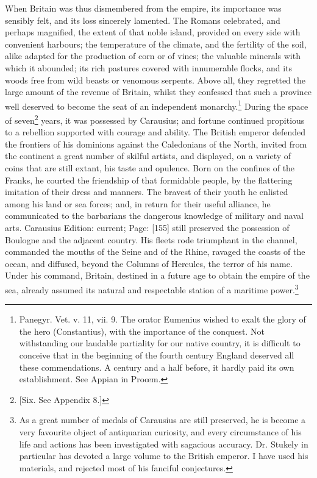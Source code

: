 When Britain was thus dismembered from the empire, its importance was sensibly felt, and its loss sincerely lamented. The Romans celebrated, and perhaps magnified, the extent of that noble island, provided on every side with convenient harbours; the temperature of the climate, and the fertility of the soil, alike adapted for the production of corn or of vines; the valuable minerals with which it abounded; its rich pastures covered with innumerable flocks, and its woods free from wild beasts or venomous serpents. Above all, they regretted the large amount of the revenue of Britain, whilst they confessed that such a province well deserved to become the seat of an independent monarchy.\footnote{Panegyr. Vet. v. 11, vii. 9. The orator Eumenius wished to exalt the glory of the hero (Constantius), with the importance of the conquest. Not withstanding our laudable partiality for our native country, it is difficult to conceive that in the beginning of the fourth century England deserved all these commendations. A century and a half before, it hardly paid its own establishment. See Appian in Proœm.} During the space of seven\footnote{[Six. See Appendix 8.]} years, it was possessed by Carausius; and fortune continued propitious to a rebellion supported with courage and ability. The British emperor defended the frontiers of his dominions against the Caledonians of the North, invited from the continent a great number of skilful artists, and displayed, on a variety of coins that are still extant, his taste and opulence. Born on the confines of the Franks, he courted the friendship of that formidable people, by the flattering imitation of their dress and manners. The bravest of their youth he enlisted among his land or sea forces; and, in return for their useful alliance, he communicated to the barbarians the dangerous knowledge of military and naval arts. Carausius Edition: current; Page: [155] still preserved the possession of Boulogne and the adjacent country. His fleets rode triumphant in the channel, commanded the mouths of the Seine and of the Rhine, ravaged the coasts of the ocean, and diffused, beyond the Columns of Hercules, the terror of his name. Under his command, Britain, destined in a future age to obtain the empire of the sea, already assumed its natural and respectable station of a maritime power.\footnote{As a great number of medals of Carausius are still preserved, he is become a very favourite object of antiquarian curiosity, and every circumstance of his life and actions has been investigated with sagacious accuracy. Dr. Stukely in particular has devoted a large volume to the British emperor. I have used his materials, and rejected most of his fanciful conjectures.}

